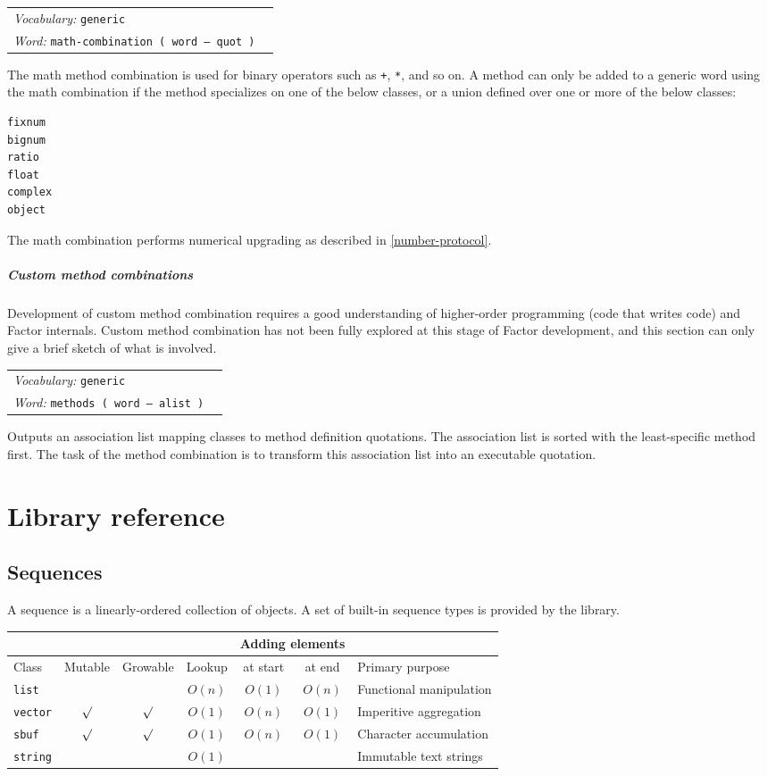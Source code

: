 \documentclass{book}
\newcommand{\vocabulary}[1]{\emph{Vocabulary:} \texttt{#1}&\\}
\newcommand{\ordinaryword}[2]{\index{\texttt{#1}}\emph{Word:} \texttt{#2}&\\}
\newcommand{\wordtable}[1]{


\begin{tabularx}{12cm}{lX}
\hline
#1
\hline
\end{tabularx}

}
\begin{document}
\wordtable{
\vocabulary{generic}
\ordinaryword{math-combination}{math-combination~( word -- quot )}
}
The math method combination is used for binary operators such as \verb|+|, \verb|*|, and so on.
A method can only be added to a generic word using the math combination if the method specializes on one of the below classes, or a union defined over one or more of the below classes:
\begin{verbatim}
fixnum
bignum
ratio
float
complex
object
\end{verbatim}
The math combination performs numerical upgrading as described in \ref{number-protocol}.

\subsubsection{Custom method combinations}

Development of custom method combination requires a good understanding of higher-order programming (code that writes code) and Factor internals. Custom method combination has not been fully explored at this stage of Factor development, and this section can only give a brief sketch of what is involved.

\wordtable{
\vocabulary{generic}
\ordinaryword{methods}{methods~( word -- alist )}
}
Outputs an association list mapping classes to method definition quotations. The association list is sorted with the least-specific method first. The task of the method combination is to transform this association list into an executable quotation.

\part{Library reference}

\chapter{Sequences}

A sequence is a linearly-ordered collection of objects. A set of built-in sequence types  is provided by the library.

\begin{tabular}[t]{l|c|c|c|c|c|l}
\multicolumn{4}{l|}{}&\multicolumn{2}{c|}{Adding elements}&\multicolumn{1}{l}{}\\
\hline
Class&Mutable&Growable&Lookup&at start&at end&Primary purpose\\
\hline
\texttt{list}&&&$O(n)$&$O(1)$&$O(n)$&Functional manipulation\\
\texttt{vector}&$\surd$&$\surd$&$O(1)$&$O(n)$&$O(1)$&Imperitive aggregation\\
\texttt{sbuf}&$\surd$&$\surd$&$O(1)$&$O(n)$&$O(1)$&Character accumulation\\
\texttt{string}&&&$O(1)$&&&Immutable text strings
\end{tabular}
\end{document}
